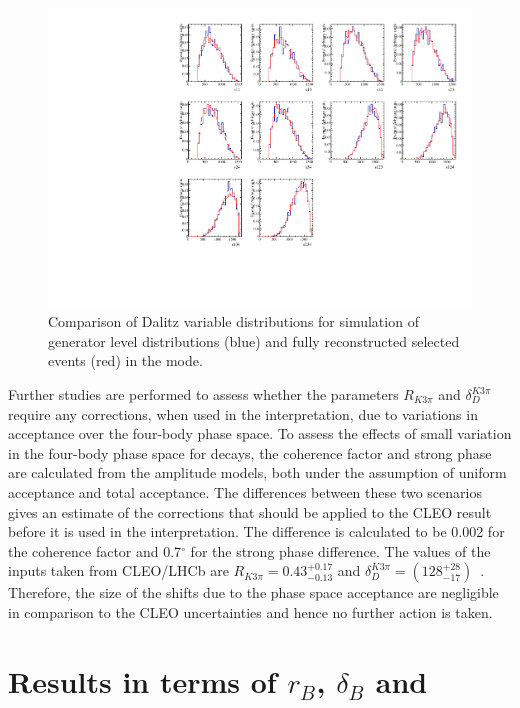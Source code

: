 \begin{figure}[h]
\centering
\includegraphics[width=0.8\linewidth]{figures/results/dalitzDist_PiPiPiPi.pdf}
\caption{Comparison of Dalitz variable distributions for simulation of generator level distributions (blue) and fully reconstructed selected events (red) in the \pipipipi mode.}
\label{dalitz4pi}
\end{figure}

Further studies are performed to assess whether the parameters $R_{K3\pi}$ and $\delta_D^{K3\pi}$ require any corrections, when used in the interpretation, due to variations in acceptance over the four-body phase space. To assess the effects of small variation in the four-body phase space for \kpipipi decays, the coherence factor and strong phase are calculated from the \kpipipi amplitude models, both under the assumption of uniform acceptance and total \lhcb acceptance. The differences between these two scenarios gives an estimate of the corrections that should be applied to the CLEO result before it is used in the \lhcb interpretation. The difference is calculated to be 0.002 for the coherence factor and 0.7$^{\circ}$ for the strong phase difference. The values of the inputs taken from CLEO/LHCb are $R_{K3\pi} = 0.43^{+0.17}_{-0.13}$ and $\delta_D^{K3\pi} = \left(128^{+28}_{-17}\right)$~\cite{charmk3pi}. Therefore, the size of the shifts due to the \lhcb phase space acceptance are negligible in comparison to the CLEO uncertainties and hence no further action is taken.


\section{Results in terms of $r_B$, $\delta_B$ and \Pgamma}
\label{sec:interpretation:gammadini}

